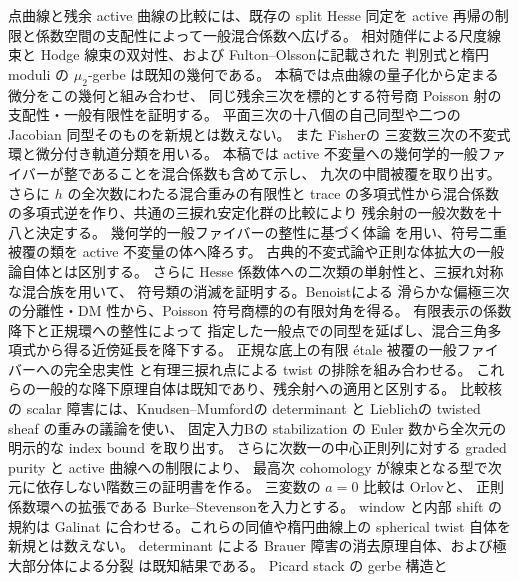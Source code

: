 \documentclass[11pt,a4paper]{ltjsarticle}
\numberwithin{equation}{section}
\begin{document}
点曲線と残余 active 曲線の比較には、既存の split Hesse 同定を
active 再帰の制限と係数空間の支配性によって一般混合係数へ広げる。
相対随伴による尺度線束と Hodge 線束の双対性、および
Fulton--Olsson\cite[Section~1; proof of Corollary~2.4]{NFMFultonOlsson}に記載された
判別式と楕円 moduli の $\mu_2$-gerbe は既知の幾何である。
本稿では点曲線の量子化から定まる微分をこの幾何と組み合わせ、
同じ残余三次を標的とする符号商 Poisson 射の支配性・一般有限性を証明する。
平面三次の十八個の自己同型や二つの Jacobian 同型そのものを新規とは数えない。
また Fisher\cite[Theorem~1.1, Lemmas~2.2, 2.6]{NFMFisherTernary}の
三変数三次の不変式環と微分付き軌道分類を用いる。
本稿では active 不変量への幾何学的一般ファイバーが整であることを混合係数も含めて示し、
九次の中間被覆を取り出す。さらに $h$ の全次数にわたる混合重みの有限性と
trace の多項式性から混合係数の多項式逆を作り、共通の三捩れ安定化群の比較により
残余射の一般次数を十八と決定する。
幾何学的一般ファイバーの整性に基づく体論
\cite{NFMStacksRegularFields}を用い、符号二重被覆の類を active 不変量の体へ降ろす。
古典的不変式論や正則な体拡大の一般論自体とは区別する。
さらに Hesse 係数体への二次類の単射性と、三捩れ対称な混合族を用いて、
符号類の消滅を証明する。Benoist\cite[Theorems~1.6--1.7]{NFMBenoistSeparation}による
滑らかな偏極三次の分離性・DM 性から、Poisson 符号商標的の有限対角を得る。
有限表示の係数降下\cite{NFMStacksStackLimits}と正規環への整性によって
指定した一般点での同型を延ばし、混合三角多項式から得る近傍延長を降下する。
正規な底上の有限 étale 被覆の一般ファイバーへの完全忠実性
\cite{NFMStacksEtaleNormal}と有理三捩れ点による twist の排除を組み合わせる。
これらの一般的な降下原理自体は既知であり、残余射への適用と区別する。
比較核の scalar 障害には、Knudsen--Mumford\cite{NFMKnudsenMumfordDet}の determinant と
Lieblich\cite[Sections~2.2.4--2.2.5]{NFMLieblichTwisted}の twisted sheaf の重みの議論を使い、
固定入力Bの stabilization の Euler 数から全次元の明示的な index bound を取り出す。
さらに次数一の中心正則列に対する graded purity と active 曲線への制限により、
最高次 cohomology が線束となる型で次元に依存しない階数三の証明書を作る。
三変数の $a=0$ 比較は Orlov\cite[Theorem~2.5(iii)]{NFMOrlovSingularities}と、
正則係数環への拡張である Burke--Stevenson\cite[Theorem~6.4(3)]{NFMBurkeStevenson}を入力とする。
window と内部 shift の規約は Galinat\cite[Section~1.1, Lemma~1.2; proof of Lemma~2.7]{NFMGalinat}
に合わせる。これらの同値や楕円曲線上の spherical twist 自体を新規とは数えない。
determinant による Brauer 障害の消去原理自体、および極大部分体による分裂
\cite{NFMStacksSplitting}は既知結果である。
Picard stack の gerbe 構造\cite{NFMStacksPicardGerbe}と
\end{document}
